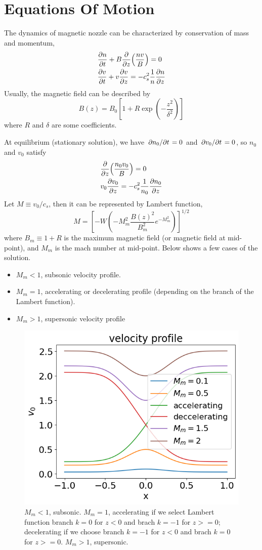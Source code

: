 \chapter{Equations Of Motion}
The dynamics of magnetic nozzle can be characterized by conservation of mass and momentum,
\begin{align*}
    &\pdv{n}{t} + B\pdv{z}(\frac{nv}{B}) = 0\\
    &\pdv{v}{t} + v\pdv{v}{z} = -c_s^2\frac{1}{n}\pdv{n}{z}
\end{align*}
Usually, the magnetic field can be described by
\[ B(z) = B_0\left[ 1 + R\exp(-\frac{z^2}{\delta^2}) \right] \]
where $R$ and $\delta$ are some coefficients.

At equilibrium (stationary solution), we have $\pdv*{n_0}{t}=0$ and $\pdv*{v_0}{t}=0$, so $n_0$ and $v_0$ satisfy
\begin{align*}
    &\pdv{z}(\frac{n_0v_0}{B}) = 0 \\
    &v_0\pdv{v_0}{z} = -c_s^2\frac{1}{n_0}\pdv{n_0}{z} 
\end{align*}
Let $M\equiv v_0/c_s$, then it can be represented by Lambert function, 
\[ M = \left[ -W\left(-M_m^2 \frac{B(z)^2}{B_m^2}e^{-M_m^2}\right) \right]^{1/2} \]
where $B_m\equiv 1+R$ is the maximum magnetic field (or magnetic field at mid-point), and $M_m$ is the mach number at mid-point. Below shows a few cases of the solution.
\begin{itemize}
    \item $M_m < 1$, subsonic velocity profile.
    \item $M_m = 1$, accelerating or decelerating profile (depending on the branch of the Lambert function).
    \item $M_m > 1$, supersonic velocity profile
\end{itemize}
\begin{figure}[H]
    \centering
    \includegraphics[width=0.7\linewidth]{img/nozzle-velocity-profile.png}
    \caption{$M_m < 1$, subsonic. $M_m = 1$, accelerating if we select Lambert function branch $k=0$ for $z<0$ and brach $k=-1$ for $z>=0$; decelerating if we choose branch $k=-1$ for $z<0$ and brach $k=0$ for $z>=0$. $M_m > 1$, supersonic.}
    \label{fig:nozzle-velocity-profile}
\end{figure}

